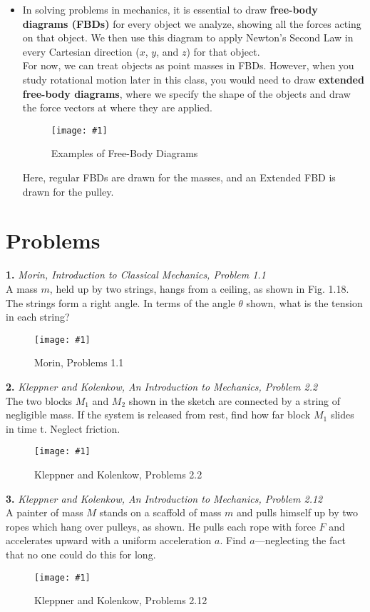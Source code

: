 \documentclass[11pt]{article}
\newcommand{\fig}[4]{
    \begin{figure}[H]
        \centering
        \texttt{[image: \#1]}
        \caption{#2}
        \label{exp4fit}
    \end{figure}
}
\theoremstyle{gangnamstyle}{\newtheorem{definition}{Definition}[]}
\theoremstyle{gangnamstyle}{\newtheorem{example}{Example}[]}
\theoremstyle{gangnamstyle}{\newtheorem{problem}{Problem}[]}
\begin{document}
\begin{itemize}
\pagebreak

\item In solving problems in mechanics, it is essential to draw \textbf{free-body diagrams (FBDs)} for every object we analyze, showing all the forces acting on that object. We then use this diagram to apply Newton's Second Law in every Cartesian direction ($x$, $y$, and $z$) for that object. \\

For now, we can treat objects as point masses in FBDs. However, when you study rotational motion later in this class, you would need to draw \textbf{extended free-body diagrams}, where we specify the shape of the objects and draw the force vectors at where they are applied. 

\fig{figs/0625/fbd.png}{Examples of Free-Body Diagrams}{0.6}{0}

Here, regular FBDs are drawn for the masses, and an Extended FBD is drawn for the pulley.

\end{itemize}

\pagebreak

\section{Problems}

\textbf{1.} \textit{Morin, Introduction to Classical Mechanics, Problem 1.1} \\
A mass $m$, held up by two strings, hangs from a ceiling, as shown in Fig. 1.18. The strings form a right angle. In terms of the angle $\theta$ shown, what is the tension in each string?
\fig{figs/0625/morin11.png}{Morin, Problems 1.1}{0.75}{0}
\vspace{1.35 in}

\textbf{2.} \textit{Kleppner and Kolenkow, An Introduction to Mechanics, Problem 2.2} \\
The two blocks $M_1$ and $M_2$ shown in the sketch are connected by a string of negligible mass. If the system is released from rest, find how far block $M_1$ slides in time t. Neglect friction. 
\fig{figs/0625/kk22.png}{Kleppner and Kolenkow, Problems 2.2}{0.5}{0}

\pagebreak

\textbf{3.} \textit{Kleppner and Kolenkow, An Introduction to Mechanics, Problem 2.12} \\
A painter of mass $M$ stands on a scaffold of mass $m$ and pulls himself up by two ropes which hang over pulleys, as shown. He pulls each rope with force $F$ and accelerates upward with a uniform acceleration $a$. Find $a$—neglecting the fact that no one could do this for long.
\fig{figs/0625/kk212.png}{Kleppner and Kolenkow, Problems 2.12}{0.6}{0}
\end{document}
